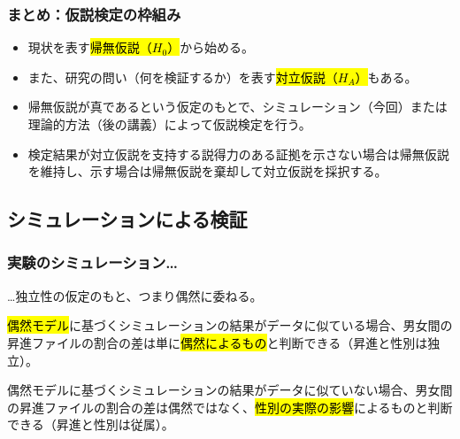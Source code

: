\begin{frame}
\frametitle{まとめ：仮説検定の枠組み}

\begin{itemize}
\item 現状を表す\hl{帰無仮説（$H_0$）}から始める。
\item また、研究の問い（何を検証するか）を表す\hl{対立仮説（$H_A$）}もある。
\item 帰無仮説が真であるという仮定のもとで、シミュレーション（今回）または理論的方法（後の講義）によって仮説検定を行う。
\item 検定結果が対立仮説を支持する説得力のある証拠を示さない場合は帰無仮説を維持し、示す場合は帰無仮説を棄却して対立仮説を採択する。
\end{itemize}

\end{frame}


\subsection{シミュレーションによる検証}


\begin{frame}
\frametitle{実験のシミュレーション…}

…独立性の仮定のもと、つまり偶然に委ねる。\\

\vspace{0.5cm}

\hl{偶然モデル}に基づくシミュレーションの結果がデータに似ている場合、男女間の昇進ファイルの割合の差は単に\hl{偶然によるもの}と判断できる（昇進と性別は独立）。\\

\vspace{0.5cm}

偶然モデルに基づくシミュレーションの結果がデータに似ていない場合、男女間の昇進ファイルの割合の差は偶然ではなく、\hl{性別の実際の影響}によるものと判断できる（昇進と性別は従属）。

\end{frame}


